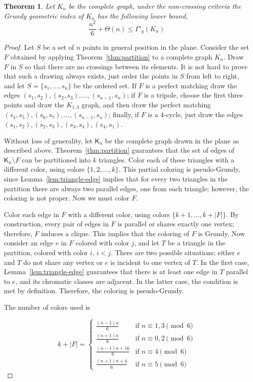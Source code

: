 \documentclass[11pt]{article}
\newtheorem{theorem}{Theorem}
\begin{document}
\begin{theorem}\label{teo:remainder} 
Let $K_n$ be the complete graph, under the non-crossing criteria the Grundy geometric index of $K_n$ has the following lower bound,
\[\frac{n^2}{6}+\Theta(n)\leq \Gamma'_g(K_n)\]
\end{theorem}
\begin{proof}

Let $S$ be a set of $n$ points in general position in the plane. Consider the set $F$ obtained by applying Theorem~\ref{thm:partition} to a complete graph $K_n$. Draw $F$ in $S$ so that there are no crossings between its elements. It is not hard to prove that such a drawing always exists, just order the points in $S$ from left to right, and let $S=\{s_1, \ldots, s_n\}$ be the ordered set. If $F$ is a perfect matching draw the edges $(s_1,s_2), (s_2,s_3), \ldots, (s_{n-1}, s_n)$; if $F$ is a tripole, choose the first three points and draw the $K_{1,3}$ graph, and then draw the perfect matching $(s_4,s_5), (s_6,s_7), \ldots, (s_{n-1}, s_n)$; finally, if $F$ is a $4$-cycle, just draw the edges $(s_1,s_2), (s_2,s_3), (s_3,s_4), (s_4,s_1)$.

Without loss of generality, let $\mathsf{K}_n$ be the complete graph drawn in the plane as described above. Theorem~\ref{thm:partition} guarantees that the set of edges of $\mathsf{K}_n \setminus F$ can be partitioned into $k$ triangles. Color each of these triangles with a different color, using colors $\{1, 2, \ldots, k\}$. 
This partial coloring is pseudo-Grundy, since Lemma~\ref{lem:triangle-edge} implies that for every two triangles in the partition there are always two parallel edges, one from each triangle; however, the coloring is not proper. Now we must color $F$.

Color each edge in $F$ with a different color, using colors $\{k+1, \ldots, k+|F|\}$. By construction, every pair of edges in $F$ is parallel or shares exactly one vertex; therefore, $F$ induces a clique. This implies that the coloring of $F$ is Grundy. Now consider an edge $e$ in $F$ colored with color $j$, and let $T$ be a triangle in the partition, colored with color $i$, $i < j$. There are two possible situations; either $e$ and $T$ do not share any vertex or $e$ is incident to one vertex of $T$. In the first case, Lemma~\ref{lem:triangle-edge} guarantees that there is at least one edge in $T$ parallel to $e$, and its chromatic classes are adjacent. In the latter case, the condition is met by definition. Therefore, the coloring is pseudo-Grundy.


The number of colors used is 

\begin{equation*}
 k + |F|  = 
  \begin{cases}
    \frac{(n-1)n}{6} & \text{if } n\equiv 1, 3 \pmod 6\\
    \frac{(n+1)n}{6} & \text{if } n\equiv 0, 2 \pmod 6\\
     \frac{(n-1)n+16}{6}  & \text{if } n\equiv 4 \pmod 6\\
    \frac{(n+1)n+4}{6} & \text{if } n\equiv 5 \pmod 6
  \end{cases}
\end{equation*}
\end{proof}
\end{document}
